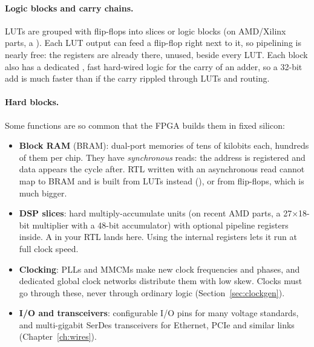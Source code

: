 \paragraph{Logic blocks and carry chains.} LUTs are grouped with flip-flops into slices or logic blocks (on AMD/Xilinx parts, a ). Each LUT output can feed a flip-flop right next to it, so pipelining is nearly free: the registers are already there, unused, beside every LUT. Each block also has a dedicated , fast hard-wired logic for the carry of an adder, so a 32-bit add is much faster than if the carry rippled through LUTs and routing.

\paragraph{Hard blocks.} Some functions are so common that the FPGA builds them in fixed silicon:
\begin{itemize}
  \item \textbf{Block RAM} (BRAM): dual-port memories of tens of kilobits each, hundreds of them per chip. They have \emph{synchronous} reads: the address is registered and data appears the cycle after. RTL written with an asynchronous read cannot map to BRAM and is built from LUTs instead (), or from flip-flops, which is much bigger.
  \item \textbf{DSP slices}: hard multiply-accumulate units (on recent AMD parts, a 27$\times$18-bit multiplier with a 48-bit accumulator) with optional pipeline registers inside. A \code{*} in your RTL lands here. Using the internal registers lets it run at full clock speed.
  \item \textbf{Clocking}: PLLs and MMCMs make new clock frequencies and phases, and dedicated global clock networks distribute them with low skew. Clocks must go through these, never through ordinary logic (Section~\ref{sec:clockgen}).
  \item \textbf{I/O and transceivers}: configurable I/O pins for many voltage standards, and multi-gigabit SerDes transceivers for Ethernet, PCIe and similar links (Chapter~\ref{ch:wires}).
\end{itemize}

